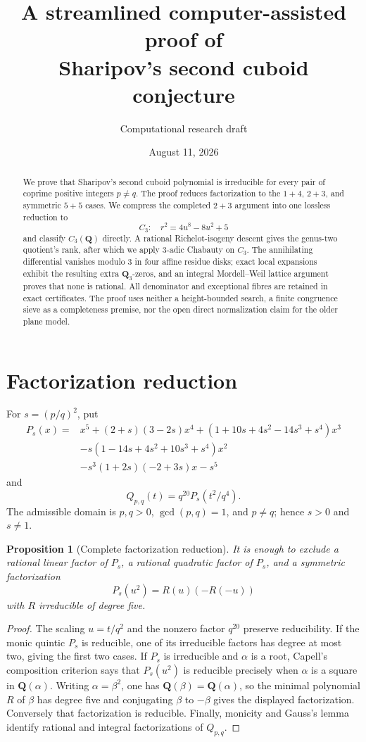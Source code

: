\documentclass[11pt]{article}
\title{A streamlined computer-assisted proof of\\
Sharipov's second cuboid conjecture}
\author{Computational research draft}
\date{August 11, 2026}
\newtheorem{proposition}[theorem]{Proposition}
\newcommand{\Q}{\mathbf Q}
\begin{document}
\maketitle

\begin{abstract}
We prove that Sharipov's second cuboid polynomial is irreducible for every
pair of coprime positive integers $p\ne q$.  The proof reduces factorization
to the $1+4$, $2+3$, and symmetric $5+5$ cases.  We compress the completed
$2+3$ argument into one lossless reduction to
\[
 C_3:\quad r^2=4u^8-8u^2+5
\]
and classify $C_3(\Q)$ directly.  A rational Richelot-isogeny descent gives
the genus-two quotient's rank, after which we apply $3$-adic Chabauty on
$C_3$.  The annihilating differential vanishes modulo
$3$ in four affine residue disks; exact local expansions exhibit the
resulting extra $\Q_3$-zeros, and an integral Mordell--Weil lattice argument
proves that none is rational.  All denominator and exceptional fibres are
retained in exact certificates.  The proof uses neither a height-bounded
search, a finite congruence sieve as a completeness premise, nor the open
direct normalization claim for the older plane model.
\end{abstract}

\section{Factorization reduction}

For $s=(p/q)^2$, put
\[
\begin{aligned}
P_s(x)={}&x^5+(2+s)(3-2s)x^4
 +(1+10s+4s^2-14s^3+s^4)x^3\\
&-s(1-14s+4s^2+10s^3+s^4)x^2\\
&-s^3(1+2s)(-2+3s)x-s^5
\end{aligned}
\]
and
\[
 Q_{p,q}(t)=q^{20}P_s(t^2/q^4).
\]
The admissible domain is $p,q>0$, $\gcd(p,q)=1$, and $p\ne q$; hence
$s>0$ and $s\ne1$.

\begin{proposition}[Complete factorization reduction]\label{prop:factor}
It is enough to exclude a rational linear factor of $P_s$, a rational
quadratic factor of $P_s$, and a symmetric factorization
\[
 P_s(u^2)=R(u)(-R(-u))
\]
with $R$ irreducible of degree five.
\end{proposition}

\begin{proof}
The scaling $u=t/q^2$ and the nonzero factor $q^{20}$ preserve
reducibility.  If the monic quintic $P_s$ is reducible, one of its
irreducible factors has degree at most two, giving the first two cases.
If $P_s$ is irreducible and $\alpha$ is a root, Capell's composition
criterion says that $P_s(u^2)$ is reducible precisely when $\alpha$ is a
square in $\Q(\alpha)$.  Writing $\alpha=\beta^2$, one has
$\Q(\beta)=\Q(\alpha)$, so the minimal polynomial $R$ of $\beta$ has degree
five and conjugating $\beta$ to $-\beta$ gives the displayed factorization.
Conversely that factorization is reducible.  Finally, monicity and Gauss's
lemma identify rational and integral factorizations of $Q_{p,q}$.
\end{proof}
\end{document}
